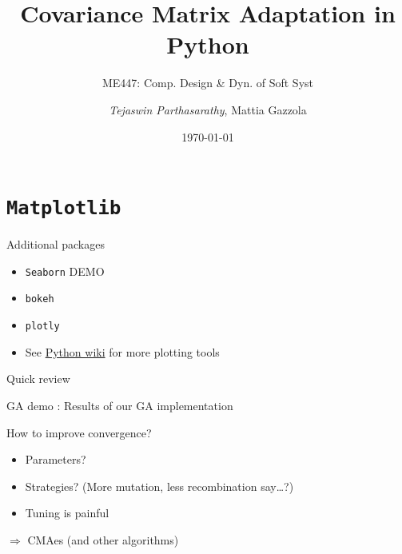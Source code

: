 \documentclass[presentation]{beamer}
\author{\emph{Tejaswin Parthasarathy}, Mattia Gazzola}
\date{\today}
\title{Covariance Matrix Adaptation in Python}
\subtitle{ME447: Comp. Design \& Dyn. of Soft Syst}
\begin{document}
\maketitle
{}
\section{\texttt{Matplotlib}}
\label{sec:org6ee20f1}
\begin{frame}[label={sec:orgc5b31f8},fragile]{Additional packages}
 \begin{itemize}
\item \texttt{Seaborn}  \alert{DEMO}
\item \texttt{bokeh}
\item \texttt{plotly}
\item See \href{https://wiki.python.org/moin/NumericAndScientific/Plotting}{Python wiki} for more plotting tools
\end{itemize}
\end{frame}
\begin{frame}[label={sec:org8073256}]{Quick review}
\begin{block}{GA demo : Results of our GA implementation}
\end{block}
\begin{block}{How to improve convergence?}
\begin{itemize}
\item Parameters?
\item Strategies? (More mutation, less recombination say\ldots{}?)
\item Tuning is painful
\end{itemize}
\end{block}
\begin{block}{\(\Rightarrow\) CMAes (and other algorithms)}
\end{block}
\end{frame}
\end{document}
